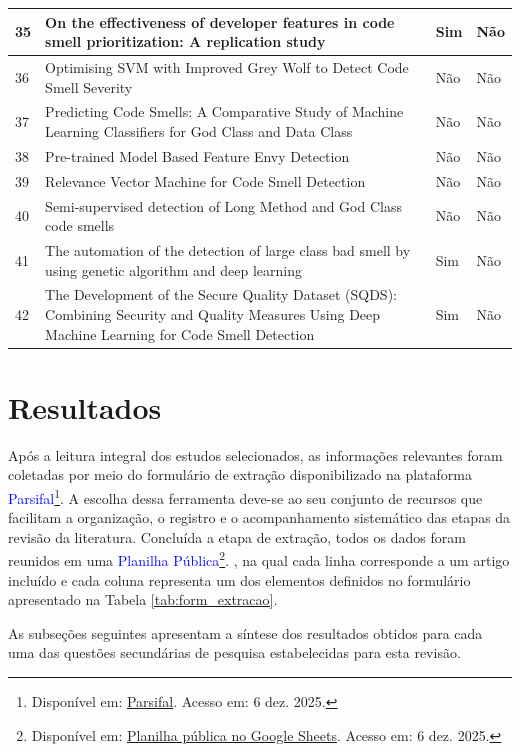 {\begin{longtable}{|p{0.8cm}|p{8cm}|p{3cm}|p{3cm}|}
    35 & On the effectiveness of developer features in code smell prioritization: A replication study & Sim & Não \\ \hline
    36 & Optimising SVM with Improved Grey Wolf to Detect Code Smell Severity & Não & Não \\ \hline
    37 & Predicting Code Smells: A Comparative Study of Machine Learning Classifiers for God Class and Data Class & Não & Não \\ \hline
    38 & Pre-trained Model Based Feature Envy Detection & Não & Não \\ \hline
    39 & Relevance Vector Machine for Code Smell Detection & Não & Não \\ \hline
    40 & Semi-supervised detection of Long Method and God Class code smells & Não & Não \\ \hline
    41 & The automation of the detection of large class bad smell by using genetic algorithm and deep learning & Sim & Não \\ \hline
    42 & The Development of the Secure Quality Dataset (SQDS): Combining Security and Quality Measures Using Deep Machine Learning for Code Smell Detection & Sim & Não \\ \hline
\end{longtable}


\section{Resultados}

Após a leitura integral dos estudos selecionados, as informações relevantes foram coletadas 
por meio do formulário de extração disponibilizado na plataforma \textcolor{blue}{Parsifal}\footnote{Disponível em: \href{https://parsif.al/}{Parsifal}. Acesso em: 6 dez. 2025.}. 
A escolha dessa ferramenta deve-se ao seu conjunto de recursos que facilitam a 
organização, o registro e o acompanhamento sistemático das etapas da revisão da 
literatura. Concluída a etapa de extração, todos os dados foram reunidos em uma \textcolor{blue}{Planilha Pública}\footnote{Disponível em: \href{https://docs.google.com/spreadsheets/d/1M7O3XaPWmCosbVVUEL5x_SoTdyJq00plgjIqLLp0WLQ/edit?usp=sharing}{Planilha pública no Google Sheets}. Acesso em: 6 dez. 2025.}. , na qual cada linha corresponde a um artigo incluído e cada coluna representa um dos 
elementos definidos no formulário apresentado na Tabela \ref{tab:form_extracao}.




As subseções seguintes apresentam a síntese dos resultados obtidos para cada uma das questões secundárias de pesquisa estabelecidas para esta revisão.

}
